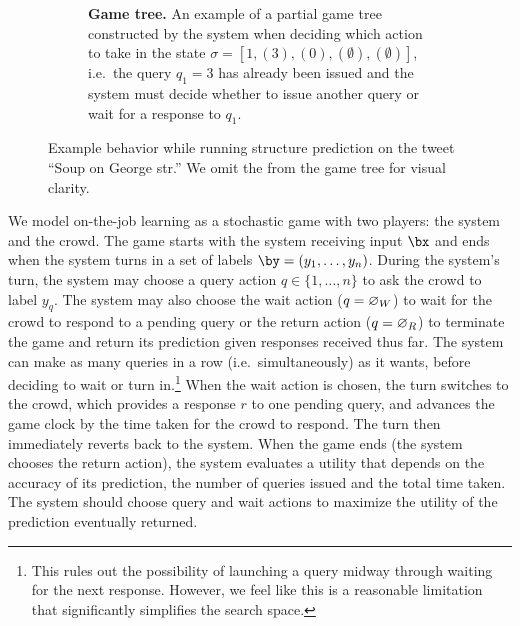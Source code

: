 \begin{figure}
\begin{centering}
\begin{subfigure}[b]{0.38\textwidth}
      \caption{
      {\bf Game tree.} An example of a partial game tree constructed by the system when deciding which action to take in the state $\sigma = [1, (3), (0), (\emptyset), (\emptyset)]$, i.e.\ the query $q_1 = 3$ has already been issued and the system must decide whether to issue another query or wait for a response to $q_1$.
      }
    \end{subfigure}
  \end{centering}
\caption{Example behavior while running structure prediction on the tweet ``Soup on George str.''
We omit the \scres{} from the game tree for visual clarity.
}
\label{fig:game-tree}
\end{figure}




We model on-the-job learning as a stochastic game with two players: the system and the crowd.
The game starts with the system receiving input $\bx$ and ends when the system turns in a set of labels $\by = (y_1, \ldots, y_n)$. 
During the system's turn, the system may choose a query action $q \in \{1, \ldots, n\}$ to ask the crowd to label $y_q$. 
The system may also choose 
the wait action ($q = \varnothing_{W}$) to wait for the crowd to respond to a pending query
or
the return action ($q = \varnothing_{R}$) to terminate the game and return its prediction given responses received thus far.
The system can make as many queries in a row (i.e.\ simultaneously) as it wants, before deciding to wait or turn in.\footnote{
This rules out the possibility
of launching a query midway through waiting for the next response. However, we
feel like this is a reasonable limitation that significantly simplifies the
search space.
}
When the wait action is chosen, the turn switches to the crowd, which provides a response $r$ to one pending query, and advances the game clock by the time taken for the crowd to respond.
The turn then immediately reverts back to the system.
When the game ends (the system chooses the return action), the system evaluates a utility that depends on the accuracy of its prediction,
the number of queries issued and the total time taken.
The system should choose query and wait actions to
maximize the utility of the prediction eventually returned.

